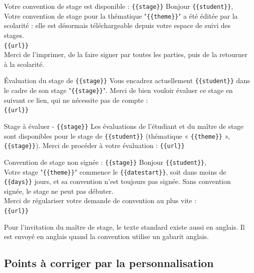 \documentclass[11pt,a4paper]{article}
\newcommand{\var}[1]{\texttt{\{\{#1\}\}}}
\begin{document}
\begin{courriel}{Votre convention de stage est disponible : \var{stage}}
Bonjour \var{student},\\[4pt]
Votre convention de stage pour la thématique "\var{theme}" a été éditée par la
scolarité : elle est désormais téléchargeable depuis votre espace de suivi des
stages.\\
\var{url}\\[4pt]
Merci de l'imprimer, de la faire signer par toutes les parties, puis de la
retourner à la scolarité.
\end{courriel}

\begin{courriel}{Évaluation du stage de \var{stage}}
Vous encadrez actuellement \var{student} dans le cadre de son stage
"\var{stage}". Merci de bien vouloir évaluer ce stage en suivant ce lien, qui ne
nécessite pas de compte :\\
\var{url}
\end{courriel}

\begin{courriel}{Stage à évaluer - \var{stage}}
Les évaluations de l'étudiant et du maître de stage sont disponibles pour le
stage de \var{student} (thématique « \var{theme} », \var{stage}). Merci de
procéder à votre évaluation : \var{url}
\end{courriel}

\begin{courriel}{Convention de stage non signée : \var{stage}}
Bonjour \var{student},\\[4pt]
Votre stage "\var{theme}" commence le \var{datestart}, soit dans moins de
\var{days} jours, et sa convention n'est toujours pas signée. Sans convention
signée, le stage ne peut pas débuter.\\[4pt]
Merci de régulariser votre demande de convention au plus vite :\\
\var{url}
\end{courriel}

Pour l'invitation du maître de stage, le texte standard existe aussi en anglais.
Il est envoyé en anglais quand la convention utilise un gabarit anglais.

\subsection{Points à corriger par la personnalisation}
\end{document}
